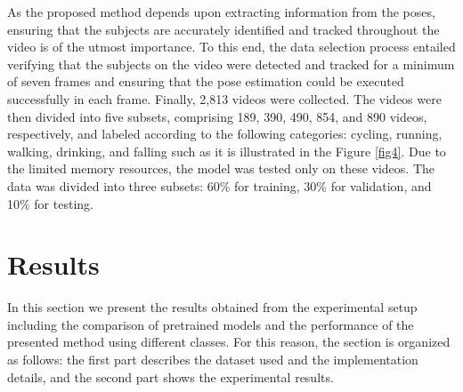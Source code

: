 \documentclass[mathematics,article,submit,pdftex,moreauthors]{Definitions/mdpi}
\begin{document}
As the proposed method depends upon extracting information from the poses, ensuring that the subjects are accurately identified and tracked throughout the video is of the utmost importance. To this end, the data selection process entailed verifying that the subjects on the video were detected and tracked for a minimum of seven frames and ensuring that the pose estimation could be executed successfully in each frame. Finally, 2,813 videos were collected. The videos were then divided into five subsets, comprising 189, 390, 490, 854, and 890 videos, respectively, and labeled according to the following categories: cycling, running, walking, drinking, and falling such as it is illustrated in the Figure \ref{fig4}. Due to the limited memory resources, the model was tested only on these videos. The data was divided into three subsets: 60\% for training, 30\% for validation, and 10\% for testing.




\section{Results}

In this section we present the results obtained from the experimental setup including the comparison of pretrained models and the performance of the presented method using different classes. For this reason, the section is organized as follows: the first part describes the dataset used and the implementation details, and the second part shows the experimental results.
\end{document}
